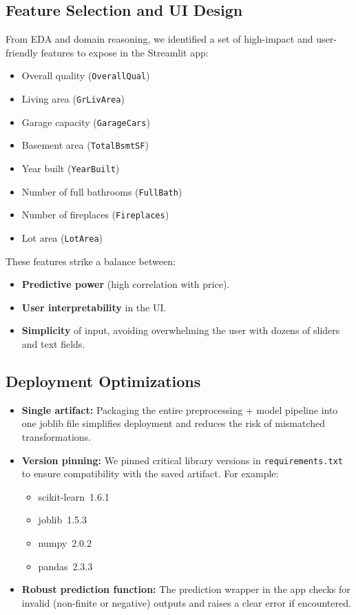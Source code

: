 \documentclass[11pt,a4paper]{article}
\begin{document}
\subsection{Feature Selection and UI Design}

From EDA and domain reasoning, we identified a set of high-impact and user-friendly features to expose in the Streamlit app:

\begin{itemize}[leftmargin=*]
    \item Overall quality (\texttt{OverallQual})
    \item Living area (\texttt{GrLivArea})
    \item Garage capacity (\texttt{GarageCars})
    \item Basement area (\texttt{TotalBsmtSF})
    \item Year built (\texttt{YearBuilt})
    \item Number of full bathrooms (\texttt{FullBath})
    \item Number of fireplaces (\texttt{Fireplaces})
    \item Lot area (\texttt{LotArea})
\end{itemize}

These features strike a balance between:

\begin{itemize}[leftmargin=*]
    \item \textbf{Predictive power} (high correlation with price).
    \item \textbf{User interpretability} in the UI.
    \item \textbf{Simplicity} of input, avoiding overwhelming the user with dozens of sliders and text fields.
\end{itemize}

\subsection{Deployment Optimizations}

\begin{itemize}[leftmargin=*]
    \item \textbf{Single artifact:} Packaging the entire preprocessing + model pipeline into one joblib file simplifies deployment and reduces the risk of mismatched transformations.
    \item \textbf{Version pinning:} We pinned critical library versions in \texttt{requirements.txt} to ensure compatibility with the saved artifact. For example:
    \begin{itemize}
        \item scikit-learn~1.6.1
        \item joblib~1.5.3
        \item numpy~2.0.2
        \item pandas~2.3.3
    \end{itemize}
    \item \textbf{Robust prediction function:} The prediction wrapper in the app checks for invalid (non-finite or negative) outputs and raises a clear error if encountered.
\end{itemize}
\end{document}
